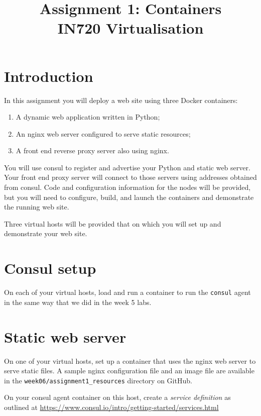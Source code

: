 \documentclass{article}
\begin{document}
\title{Assignment 1: Containers\\ IN720 Virtualisation}
\date{}
\maketitle

\section*{Introduction}
In this assignment you will deploy a web site using three Docker containers:

\begin{enumerate}
  \item A dynamic web application written in Python;
  \item An nginx web server configured to serve static resources;
  \item A front end reverse proxy server also using nginx.
  \end{enumerate}
  
  
  
 You will use consul to register and advertise your Python and static web server. Your front end proxy server will connect to those servers using addresses obtained from consul. Code and configuration information for the nodes will be provided, but you will need to configure, build, and launch the containers and demonstrate the running web site.
 
 Three virtual hosts will be provided that on which you will set up and demonstrate your web site.

\section{Consul setup}
On each of your virtual hosts, load and run a container to run the \texttt{consul} agent in the same way that we did in the week 5 labs.

\section{Static web server}
On one of your virtual hosts, set up a container that uses the nginx web server to serve static files. A sample nginx configuration file and an image file are available in the \texttt{week06/assignment1\_resources} directory on GitHub.

On your consul agent container on this host, create a \emph{service definition} as outlined at \url{https://www.consul.io/intro/getting-started/services.html}
\end{document}
